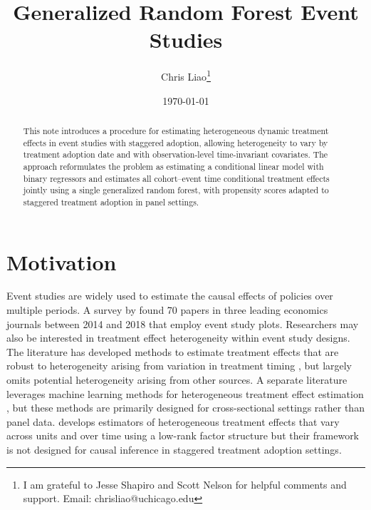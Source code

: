 \documentclass[12pt,notitlepage]{article}
\begin{document}
\title{Generalized Random Forest Event Studies}

\author{
  Chris Liao\thanks{I am grateful to Jesse Shapiro and Scott Nelson for helpful comments and support.
Email: chrisliao@uchicago.edu} \\
}
\date{\today}
\maketitle

\begin{abstract}
\noindent 
This note introduces a procedure for estimating heterogeneous dynamic treatment effects in event studies with staggered adoption, allowing heterogeneity to vary by treatment adoption date and with observation-level time-invariant covariates.
The approach reformulates the problem as estimating a conditional linear model with binary regressors and estimates all cohort–event time conditional treatment effects jointly using a single generalized random forest, with propensity scores adapted to staggered treatment adoption in panel settings. 
\vspace{0in}\\
\end{abstract}

\section{Motivation}
Event studies are widely used to estimate the causal effects of policies over multiple periods. 
A survey by \cite{roth_pretest_2022} found 70 papers in three leading economics journals between 2014 and 2018 that employ event study plots.
Researchers may also be interested in treatment effect heterogeneity within event study designs.
The literature has developed methods to estimate treatment effects that are robust to heterogeneity arising from variation in treatment timing \citep{GOODMANBACON2021254, sun_estimating_2021, callaway_difference--differences_2021, athey_design_2022}, but largely omits potential heterogeneity arising from other sources. 
A separate literature  leverages machine learning methods for heterogeneous treatment effect estimation \citep{wager_estimation_2018, athey_generalized_2019, nie_quasi-oracle_2021, chernozhukov2025generic}, but these methods are primarily designed for cross-sectional settings rather than panel data.
\cite{chernozhukov2019inference} develops estimators of heterogeneous treatment effects that vary across units and over time using a low-rank factor structure but their framework is not designed for causal inference in staggered treatment adoption settings. 
\end{document}
